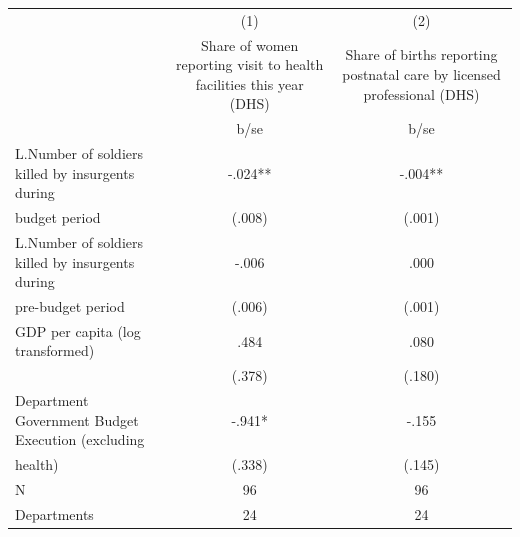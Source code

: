 {
\def\sym#1{\ifmmode^{#1}\else\(^{#1}\)\fi}
\begin{tabular}{l*{2}{c}}
\hline\hline
                                                  &\multicolumn{1}{c}{(1)}&\multicolumn{1}{c}{(2)}\\
                                                  &\multicolumn{1}{c}{Share of women reporting visit to health facilities this year (DHS)}&\multicolumn{1}{c}{Share of births reporting postnatal care by licensed professional (DHS)}\\
                                                  &        b/se   &        b/se   \\
\hline
L.Number of soldiers killed by insurgents during  &       -.024** &       -.004** \\
budget period                                     &      (.008)   &      (.001)   \\
L.Number of soldiers killed by insurgents during  &       -.006   &        .000   \\
pre-budget period                                 &      (.006)   &      (.001)   \\
GDP per capita (log transformed)                  &        .484   &        .080   \\
                                                  &      (.378)   &      (.180)   \\
Department Government Budget Execution (excluding &       -.941*  &       -.155   \\
health)                                           &      (.338)   &      (.145)   \\
\hline
N                                                 &          96   &          96   \\
Departments                                       &          24   &          24   \\
\hline\hline
\end{tabular}
}
